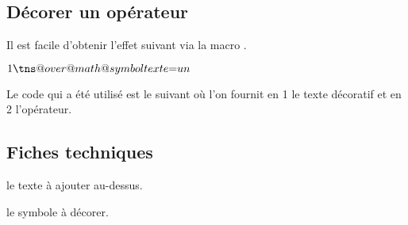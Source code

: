 \documentclass[12pt,a4paper]{article}
\begin{document}

\subsection{Décorer un opérateur}

Il est facile d'obtenir l'effet suivant via la macro .

\makeatletter
\newcommand\eqtxt{\tns@over@math@symbol{texte}{=}}
\makeatother

\begin{latexex}
$1 \eqtxt un$
\end{latexex}


Le code qui a été utilisé est le suivant où l'on fournit en 1\ier{} le texte décoratif et en 2\ieme{} l'opérateur.


\begin{latexex-alone}
\newcommand\eqtxt{\tns@over@math@symbol{texte}{=}}
\end{latexex-alone}




\subsection{Fiches techniques}


 le texte à ajouter au-dessus.

 le symbole à décorer.
\end{document}
